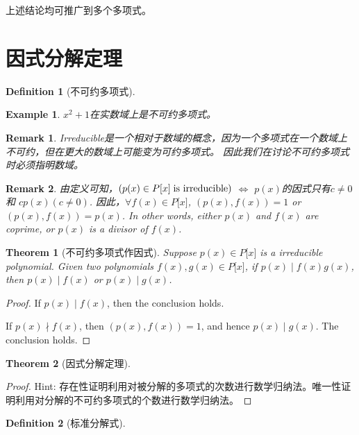 \documentclass[onecolumn]{ctexart}
\newtheorem{definition}{Definition}
\newtheorem{theorem}{Theorem}
\newtheorem{remark}{Remark}
\newtheorem{example}{Example}
\begin{document}
上述结论均可推广到多个多项式。

\section{因式分解定理}

\begin{definition}[不可约多项式]
  
\end{definition}
\begin{example}
  $x^2 + 1$在实数域上是不可约多项式。
\end{example}
\begin{remark}
  Irreducible是一个相对于数域的概念，因为一个多项式在一个数域上不可约，但在更大的数域上可能变为可约多项式。
  因此我们在讨论不可约多项式时必须指明数域。
\end{remark}
\begin{remark}
  由定义可知，$(p(x) \in P\lbrack x \rbrack \thickspace \textnormal{is irreducible})$ $\Leftrightarrow$ $p(x)$的因式只有$c \neq 0$和
  $c p(x) (c \neq 0)$. 因此，$\forall f(x) \in P\lbrack x \rbrack$, $(p(x), f(x)) = 1$ or 
  $(p(x), f(x)) = p(x)$. In other words, either $p(x)$ and $f(x)$ are coprime, or $p(x)$ 
  is a divisor of $f(x)$.
\end{remark}

\begin{theorem}[不可约多项式作因式]
  Suppose $p(x) \in P\lbrack x \rbrack$ is a irreducible polynomial. Given two 
  polynomials $f(x), g(x) \in P\lbrack x \rbrack$, if $p(x) \mid f(x)g(x)$, then 
  $p(x) \mid f(x)$ or $p(x) \mid g(x)$.
\end{theorem}
\begin{proof}
  If $p(x) \mid f(x)$, then the conclusion holds.
    
  If $p(x) \nmid f(x)$, then $(p(x), f(x)) = 1$, and hence $p(x) \mid 
  g(x)$. The conclusion holds.
\end{proof}

\begin{theorem}[因式分解定理]
  
\end{theorem}
\begin{proof}
  Hint: 存在性证明利用对被分解的多项式的次数进行数学归纳法。唯一性证明利用对分解的不可约多项式的个数进行数学归纳法。
\end{proof}

\begin{definition}[标准分解式]
  
\end{definition}
\end{document}
